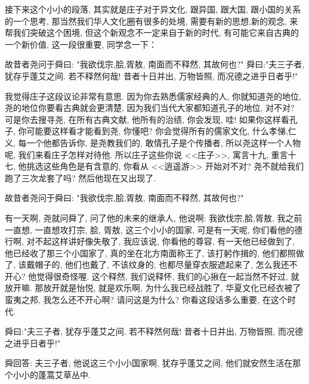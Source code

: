 \documentclass[11pt]{article}
\begin{document}
接下来这个小小的段落, 其实就是庄子对于异文化, 跟异国, 跟大国, 跟小国的关系的一个思考, 那当然我们华人文化圈有很多的处境, 需要有新的思想,新的观念, 来帮我们突破这个困境, 但这个新观念不一定来自于新的时代, 有可能它来自古典的一个新价值, 这一段很重要, 同学念一下：

{\color{blue} 故昔者尧问于舜曰: "我欲伐宗,脍,胥敖, 南面而不释然, 其故何也?" 舜曰:"夫三子者, 犹存乎蓬艾之间. 若不释然何哉! 昔者十日并出, 万物皆照, 而况德之进乎日者乎!" }

我觉得庄子这段议论非常有意思. 因为你去熟悉儒家经典的人, 你就知道尧的地位, 尧的地位你要看古典就会更清楚, 因为我们当代大家都知道孔子的地位, 对不对? 可是你去搜寻尧, 在所有古典文献, 他所有的治绩, 你会发现, 哇! 如果你这样看孔子, 你可能要这样看才能看到尧, 你懂吧? 你会觉得所有的儒家文化, 什么孝悌,仁义, 每一个他都告诉你, 是尧教我们的, 敢情孔子是个传播者, 所以尧这样一个人物呢, 我们来看庄子怎样对待他. 所以庄子这些你说 <<庄子>>, 寓言十九, 重言十七, 他挑选这些角色是有含意的, 你看从 <<逍遥游>> 开始对不对? 尧不就给我们跑了三次龙套了吗? 然后他现在又出现了. 

\begin{center}
	{\color{magenta} 故昔者尧问于舜曰: "我欲伐宗,脍,胥敖, 南面而不释然, 其故何也?"}
\end{center}

\vspace{-0.5cm}

有一天啊, 尧就问舜了, 问了他的未来的继承人, 他说啊: {\color{blue} 我欲伐宗,脍,胥敖}, 我之前一直想, 一直想攻打宗, 脍, 胥敖, 这三个小小的国家, 可是有一天呢, 你们看他的德行啊, 对不起这样讲好像失敬了, 我应该说, 你看他的尊容, 有一天他已经做到了, 他已经收了那三个小国家了, 真的坐在北方南面称王了, 该打躬作揖的, 他们都照做了, 该戴帽子的, 他们也戴了, 不该纹身的, 也都尽量穿衣服遮起来了, 怎么我还不开心? 他觉得很奇怪喔. 这个释然, 我们说释怀, 我们的心揪在一起当然不好过, 就放开嘛. 那放开就是怡悦, 就是欢乐啊, 为什么我已经战胜了, 华夏文化已经衣被了蛮夷之邦, 我怎么还不开心啊? 请问这是为什么? 你看这段话多么重要, 在这个时代.

 
\begin{center}
	{\color{magenta} 舜曰:"夫三子者, 犹存乎蓬艾之间. 若不释然何哉! 昔者十日并出, 万物皆照, 而况德之进乎日者乎!"}
\end{center}

\vspace{-0.5cm}

舜回答: {\color{blue} 夫三子者}, 他说这三个小小国家啊, {\color{blue} 犹存乎蓬艾之间}, 他们就安然生活在那个小小的蓬蒿艾草丛中.
\end{document}
